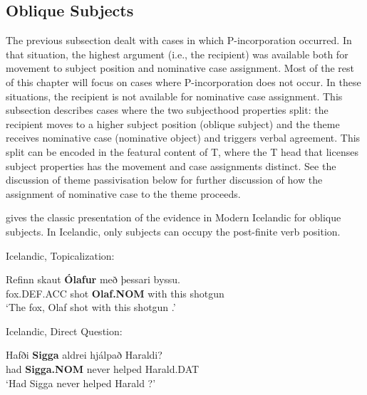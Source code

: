 \subsection{Oblique Subjects}
The previous subsection dealt with cases in which P-incorporation occurred. In that situation, the highest argument (i.e., the recipient) was available both for movement to subject position and nominative case assignment. Most of the rest of this chapter will focus on cases where P-incorporation does not occur. In these situations, the recipient is not available for nominative case assignment. This subsection describes cases where the two subjecthood properties split: the recipient moves to a higher subject position (oblique subject) and the theme receives nominative case (nominative object) and triggers verbal agreement. This split can be encoded in the featural content of T, where the T head that licenses subject properties has the movement and case assignments distinct. See the discussion of theme passivisation below for further discussion of how the assignment of nominative case to the theme proceeds.

\cite{Zaenen.1985} gives the classic presentation of the evidence in Modern Icelandic for oblique subjects. In Icelandic, only subjects can occupy the post-finite verb position.

\begin{exe}
	\ex Icelandic, Topicalization:\label{ex:ice-topic}
\begin{xlist}
	\ex \gll Refinn skaut \textbf{Ólafur} með  þessari byssu.\\
	fox.DEF.ACC shot \textbf{Olaf.NOM} with this shotgun\\
\trans `The fox, Olaf shot with this shotgun \citep[ex. 19a]{Zaenen.1985}.'
\end{xlist}
\ex Icelandic, Direct Question:\label{ex:ice-dq}
\begin{xlist}
	\ex \gll Hafði \textbf{Sigga} aldrei hjálpað Haraldi?\\
	had \textbf{Sigga.NOM} never helped Harald.DAT\\
\trans `Had Sigga never helped Harald \citep[ex. 20b]{Zaenen.1985}?'
\end{xlist}
\end{exe}


